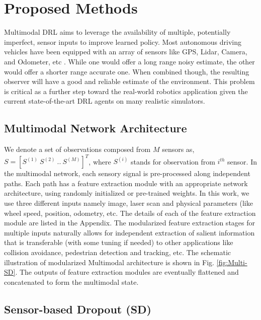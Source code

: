 \documentclass[../thesis.tex]{subfiles}
\begin{document}
\section{Proposed Methods} \label{sec:mdrl-proposed}

Multimodal DRL aims to leverage the availability of multiple, potentially imperfect, sensor inputs to improve learned policy. Most autonomous driving vehicles have been equipped with an array of sensors like GPS, Lidar, Camera, and Odometer, etc \cite{hudda2013self}. While one would offer a long range noisy estimate, the other would offer a shorter range accurate one. When combined though, the resulting observer will have a good and reliable estimate of the environment. This problem is critical as a further step toward the real-world robotics application given the current state-of-the-art DRL agents on many realistic simulators. 


\subsection{Multimodal Network Architecture}


We denote a set of observations composed from $M$ sensors as, $S = [S^{(1)}~S^{(2)}~..~S^{(M)}]^T$, where $S^{(i)}$ stands for observation from $i^{th}$ sensor. In the multimodal network, each sensory signal is pre-processed along independent paths. Each path has a feature extraction module with an appropriate network architecture, using randomly initialized or pre-trained weights. In this work, we use three different inputs namely image, laser scan and physical parameters (like wheel speed, position, odometry, etc. The details of each of the feature extraction module are listed in the Appendix. The modularized feature extraction stages for multiple inputs naturally allows for independent extraction of salient information that is transferable (with some tuning if needed) to other applications like collision avoidance, pedestrian detection and tracking, etc. The schematic illustration of modularized Multimodal architecture is shown in Fig. \ref{fig:Multi-SD}. The outputs of feature extraction modules are eventually flattened and concatenated to form the multimodal state. 

\subsection{Sensor-based Dropout (SD)} \label{sec:SD}
\end{document}

